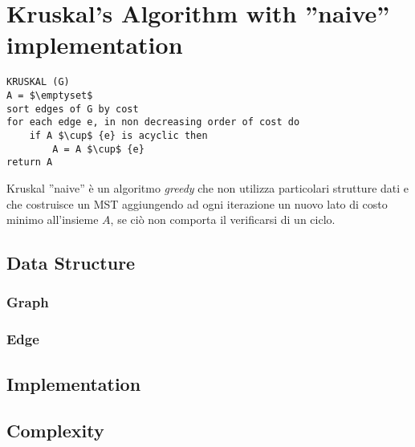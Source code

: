 \section{Kruskal's Algorithm with ''naive'' implementation}\label{kruskal_naive}

\begin{lstlisting}[mathescape=true]
KRUSKAL (G)
A = $\emptyset$
sort edges of G by cost
for each edge e, in non decreasing order of cost do
	if A $\cup$ {e} is acyclic then
		A = A $\cup$ {e}
return A	
\end{lstlisting}

Kruskal ''naive'' è un algoritmo \textit{greedy} che non utilizza particolari strutture dati e che costruisce un MST aggiungendo ad ogni iterazione un nuovo lato di costo minimo all'insieme $A$, se ciò non comporta il verificarsi di un ciclo.

\subsection{Data Structure}
	\subsubsection{Graph} 

	\subsubsection{Edge}


\subsection{Implementation}


\subsection{Complexity}
	

\pagebreak